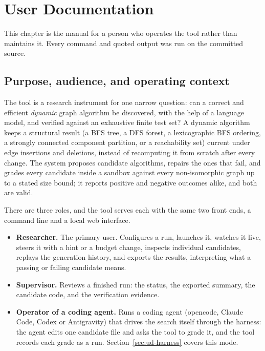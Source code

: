 \chapter{User Documentation}
\label{ch:user-documentation}


This chapter is the manual for a person who operates the tool rather than
maintains it. Every command and quoted output was run on the committed source.

\section{Purpose, audience, and operating context}
\label{sec:ud-purpose}

The tool is a research instrument for one narrow question: can a correct and
efficient \emph{dynamic} graph algorithm be discovered, with the help of a
language model, and verified against an exhaustive finite test set? A dynamic
algorithm keeps a structural result (a BFS tree, a DFS forest, a lexicographic
BFS ordering, a strongly connected component partition, or a reachability set)
current under edge insertions and deletions, instead of recomputing it from
scratch after every change. The system proposes candidate algorithms, repairs
the ones that fail, and grades every candidate inside a sandbox against every
non-isomorphic graph up to a stated size bound; it reports positive and
negative outcomes alike, and both are valid.

There are three roles, and the tool serves each with the same two front ends, a
command line and a local web interface.

\begin{itemize}
  \item \textbf{Researcher.} The primary user. Configures a run, launches it,
  watches it live, steers it with a hint or a budget change, inspects individual
  candidates, replays the generation history, and exports the results,
  interpreting what a passing or failing candidate means.
  \item \textbf{Supervisor.} Reviews a finished run: the status, the exported
  summary, the candidate code, and the verification evidence.
  \item \textbf{Operator of a coding agent.} Runs a coding agent (opencode,
  Claude Code, Codex or Antigravity) that drives the search itself through the harness: the
  agent edits one candidate file and asks the tool to grade it, and the tool
  records each grade as a run. Section~\ref{sec:ud-harness} covers this mode.
\end{itemize}

